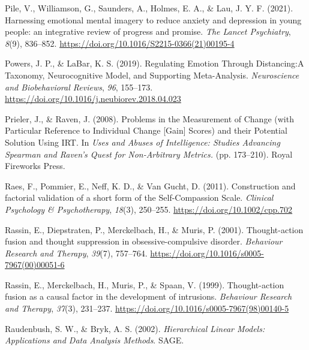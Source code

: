 \documentclass[
  man,floatsintext]{apa7}
\newlength{\cslhangindent}
\newlength{\cslentryspacingunit} %
\newenvironment{CSLReferences}[2] %
 {%
  \setlength{\parindent}{0pt}
  \ifodd #1
  \let\oldpar\par
  \def\par{\hangindent=\cslhangindent\oldpar}
  \fi
  \setlength{\parskip}{#2\cslentryspacingunit}
 }%
 {}
\begin{document}
\begin{CSLReferences}{1}{0}
\leavevmode{}%
Pile, V., Williamson, G., Saunders, A., Holmes, E. A., \& Lau, J. Y. F. (2021). Harnessing emotional mental imagery to reduce anxiety and depression in young people: an integrative review of progress and promise. \emph{The Lancet Psychiatry}, \emph{8}(9), 836--852. \url{https://doi.org/10.1016/S2215-0366(21)00195-4}

\leavevmode{}%
Powers, J. P., \& LaBar, K. S. (2019). Regulating Emotion Through Distancing:A Taxonomy, Neurocognitive Model, and Supporting Meta-Analysis. \emph{Neuroscience and Biobehavioral Reviews}, \emph{96}, 155--173. \url{https://doi.org/10.1016/j.neubiorev.2018.04.023}

\leavevmode{}%
Prieler, J., \& Raven, J. (2008). Problems in the Measurement of Change (with Particular Reference to Individual Change {[}Gain{]} Scores) and their Potential Solution Using IRT. In \emph{Uses and Abuses of Intelligence: Studies Advancing Spearman and Raven's Quest for Non-Arbitrary Metrics.} (pp. 173--210). Royal Fireworks Press.

\leavevmode{}%
Raes, F., Pommier, E., Neff, K. D., \& Van Gucht, D. (2011). Construction and factorial validation of a short form of the Self-Compassion Scale. \emph{Clinical Psychology \& Psychotherapy}, \emph{18}(3), 250--255. \url{https://doi.org/10.1002/cpp.702}

\leavevmode{}%
Rassin, E., Diepstraten, P., Merckelbach, H., \& Muris, P. (2001). Thought-action fusion and thought suppression in obsessive-compulsive disorder. \emph{Behaviour Research and Therapy}, \emph{39}(7), 757--764. \url{https://doi.org/10.1016/s0005-7967(00)00051-6}

\leavevmode{}%
Rassin, E., Merckelbach, H., Muris, P., \& Spaan, V. (1999). Thought-action fusion as a causal factor in the development of intrusions. \emph{Behaviour Research and Therapy}, \emph{37}(3), 231--237. \url{https://doi.org/10.1016/s0005-7967(98)00140-5}

\leavevmode{}%
Raudenbush, S. W., \& Bryk, A. S. (2002). \emph{Hierarchical Linear Models: Applications and Data Analysis Methods}. SAGE.


\end{CSLReferences}
\end{document}
